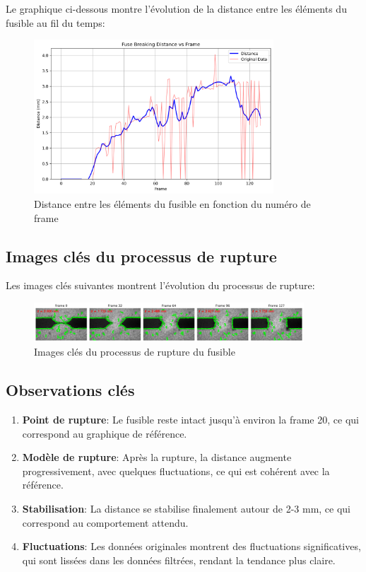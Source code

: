 \documentclass[12pt,a4paper]{article}
\begin{document}
Le graphique ci-dessous montre l'évolution de la distance entre les éléments du fusible au fil du temps:

\begin{figure}[H]
    \centering
    \includegraphics[width=0.8\textwidth]{example_images/distance_vs_frame.png}
    \caption{Distance entre les éléments du fusible en fonction du numéro de frame}
    \label{fig:distance_vs_frame}
\end{figure}

\subsection{Images clés du processus de rupture}

Les images clés suivantes montrent l'évolution du processus de rupture:

\begin{figure}[H]
    \centering
    \includegraphics[width=0.9\textwidth]{example_images/key_frames.png}
    \caption{Images clés du processus de rupture du fusible}
    \label{fig:key_frames}
\end{figure}

\subsection{Observations clés}

\begin{enumerate}
    \item \textbf{Point de rupture}: Le fusible reste intact jusqu'à environ la frame 20, ce qui correspond au graphique de référence.
    
    \item \textbf{Modèle de rupture}: Après la rupture, la distance augmente progressivement, avec quelques fluctuations, ce qui est cohérent avec la référence.
    
    \item \textbf{Stabilisation}: La distance se stabilise finalement autour de 2-3 mm, ce qui correspond au comportement attendu.
    
    \item \textbf{Fluctuations}: Les données originales montrent des fluctuations significatives, qui sont lissées dans les données filtrées, rendant la tendance plus claire.
\end{enumerate}
\end{document}
